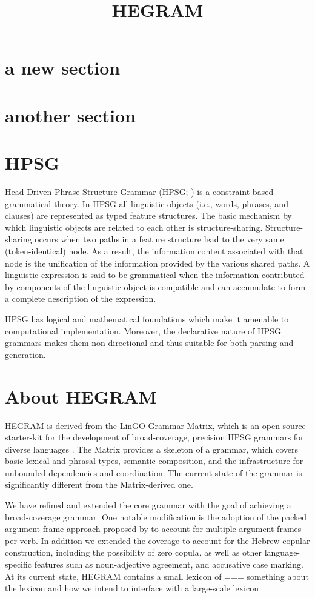 \documentclass[a4paper]{article}
\title{HEGRAM}
\begin{document}
\section{a new section}

\section{another section}

\section{HPSG}
Head-Driven Phrase Structure Grammar (HPSG; \citealt{PollardSag94}) is  a constraint-based
grammatical theory. In HPSG all linguistic objects (i.e., words, phrases, and clauses) are represented as typed feature structures.
The basic mechanism by which linguistic objects are related to each
other is structure-sharing. Structure-sharing occurs when two paths in a
feature structure lead to the very same (token-identical) node. As a result,
the information content associated with that node is the unification of the
information provided by the various shared paths. A linguistic expression
is said to be grammatical when the information contributed by components
of the linguistic object is compatible and can accumulate to form
a complete description of the expression.

HPSG has logical and mathematical foundations which make it
amenable to computational implementation. Moreover, the declarative nature of HPSG grammars makes them non-directional and thus suitable for both parsing and generation.

\section{About HEGRAM}

HEGRAM is derived from the LinGO Grammar Matrix, which is an open-source starter-kit for the development of broad-coverage, precision HPSG grammars for diverse languages \citep{BenderFlickingerOepen02}. The Matrix provides a skeleton of a grammar, which covers basic lexical and phrasal types, semantic composition, and the infrastructure for unbounded dependencies and coordination. The current state of the grammar is significantly different from the Matrix-derived one.

We have refined and extended the core grammar with the goal of achieving a broad-coverage grammar. One notable modification is the adoption of the packed argument-frame approach proposed by \citet{Haugereid11} to account for multiple argument frames per verb. In addition we extended the coverage to account for the Hebrew copular construction, including the possibility of zero copula, as well as other language-specific features such as noun-adjective agreement, and accusative case marking. At its current state, HEGRAM contains a small lexicon of
=== something about the lexicon and how we intend to interface with a large-scale lexicon
\end{document}
